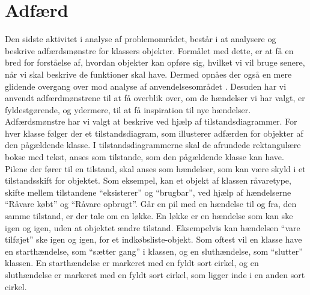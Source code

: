 \section{Adfærd}
\label{sec:adfaerd}

Den sidste aktivitet i analyse af problemområdet, består i at analysere og beskrive adfærdsmønstre for klassers objekter. Formålet med dette, er at få en bred for forståelse af, hvordan objekter kan opføre sig, hvilket vi vil bruge senere, når vi skal beskrive de funktioner \Foodl{} skal have. Dermed opnåes der også en mere glidende overgang over mod analyse af anvendelsesområdet . Desuden har vi anvendt adfærdmønstrene til at få overblik over, om de hændelser vi har valgt, er fyldestgørende, og ydermere, til at få inspiration til nye hændelser. Adfærdsmønstre har vi valgt at beskrive ved hjælp af tilstandsdiagrammer. For hver klasse følger der et tilstandsdiagram, som illusterer adfærden for objekter af den pågældende klasse. I tilstandsdiagrammerne skal de afrundede rektangulære bokse med tekst, anses som tilstande, som den pågældende klasse kan have. Pilene der fører til en tilstand, skal anses som hændelser, som kan være skyld i et tilstandsskift for objektet. Som eksempel, kan et objekt af klassen råvaretype, skifte mellem tilstandene ``eksisterer'' og ``brugbar'', ved hjælp af hændelserne ``Råvare købt'' og ``Råvare opbrugt''. Går en pil med en hændelse til og fra, den samme tilstand, er der tale om en løkke. En løkke er en hændelse som kan ske igen og igen, uden at objektet ændre tilstand. Eksempelvis kan hændelsen ``vare tilføjet'' ske igen og igen, for et indkøbsliste-objekt. Som oftest vil en klasse have en starthændelse, som ``sætter gang'' i klassen, og en sluthændelse, som ``slutter'' klassen. En starthændelse er markeret med en fyldt sort cirkel, og en sluthændelse er markeret med en fyldt sort cirkel, som ligger inde i en anden sort cirkel.


%



%


